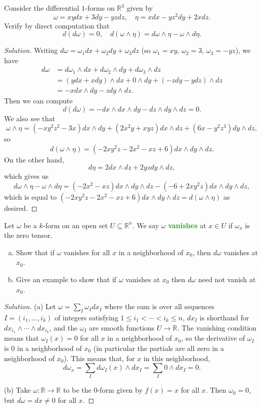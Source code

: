 \documentclass[10pt]{scrartcl}
\providecommand{\RR}{\mathbb R}
\providecommand{\ii}{\item}
\newenvironment{soln}{\begin{proof}[Solution]}{\end{proof}}
\providecommand{\vocab}[1]{{\textbf{\textcolor{ForestGreen}{#1}}}}
\begin{document}
\begin{problem}
	Consider the differential $1$-forms on $\RR^3$ given by
	\[\omega = xyd x+3dy-yzdz,\quad \eta = xdx-yz^2dy+2xdz.\]
	Verify by direct computation that
	\[d(d\omega) = 0,\quad
	d(\omega\wedge\eta) = d\omega\wedge\eta-\omega\wedge d\eta.\]
\end{problem}

\begin{soln}
	Writing $d\omega = \omega_1dx + \omega_2dy + \omega_3dz$
	(so $\omega_1 = xy$, $\omega_2 = 3$, $\omega_3 = -yz$), we have
	\begin{align*}
		d\omega &=
		d\omega_1\wedge dx + d\omega_2\wedge dy + d\omega_3\wedge dz\\
		&= (ydx + xdy)\wedge dx + 0\wedge dy + (-zdy - ydz)\wedge dz\\
		&= -xdx\wedge dy - zdy\wedge dz.
	\end{align*}
	Then we can compute
	\[d(d\omega) = -dx\wedge dx\wedge dy - dz\wedge dy\wedge dz = 0.\]
	We also see that
	\[\omega\wedge\eta =
	(-xy^2z^2-3x)dx\wedge dy + (2x^2y+xyz)dx\wedge dz+(6x-y^2z^3)dy\wedge dz,\]
	so
	\[d(\omega\wedge\eta) = (-2xy^2z-2x^2-xz+6)dx\wedge dy\wedge dz.\]
	On the other hand,
	\[d\eta = 2dx\wedge dz + 2yzdy\wedge dz,\]
	which gives us
	\[d\omega\wedge\eta - \omega\wedge d\eta =
	(-2x^2-xz)dx\wedge dy\wedge dz - (-6 + 2xy^2z)dx\wedge dy\wedge dz,\]
	which is equal to $(-2xy^2z-2x^2-xz+6)dx\wedge dy\wedge dz
	=d(\omega\wedge\eta)$ as desired.
\end{soln}

\begin{problem}
	Let $\omega$ be a $k$-form on an open set $U\subseteq\RR^n$.
	We say $\omega$ \vocab{vanishes} at $x\in U$ if $\omega_x$
	is the zero tensor.
	\begin{enumerate}[(a)]
		\ii Show that if $\omega$ vanishes for all $x$ in
		a neighborhood of $x_0$, then $d\omega$ vanishes at $x_0$.
		\ii Give an example to show that if $\omega$ vanishes at $x_0$
		then $d\omega$ need not vanish at $x_0$.
	\end{enumerate}
\end{problem}

\begin{soln}
	(a) Let $\omega = \sum_I\omega_Idx_I$ where the sum is over all
	sequences $I = (i_1,\dots,i_k)$ of integers satisfying
	$1\le i_1<\cdots<i_k\le n$, $dx_I$ is shorthand for
	$dx_{i_1}\wedge\cdots\wedge dx_{i_k}$, and the $\omega_I$ are
	smooth functions $U\to\RR$. The vanishing condition means that
	$\omega_I(x) = 0$ for all $x$ in a neighborhood of $x_0$,
	so the derivative of $\omega_I$ is $0$ in a neighborhood of $x_0$
	(in particular the partials are all zero in a neighborhood of $x_0$).
	This means that, for $x$ in this neighborhood,
	\[d\omega_x = \sum_{I}d\omega_I(x)\wedge dx_I = \sum_I 0\wedge dx_I =0.\]

	(b) Take $\omega\colon\RR\to\RR$ to be the $0$-form given by $f(x) = x$
	for all $x$. Then $\omega_0 = 0$, but $d\omega = dx\ne 0$ for all $x$.
\end{soln}
\end{document}
